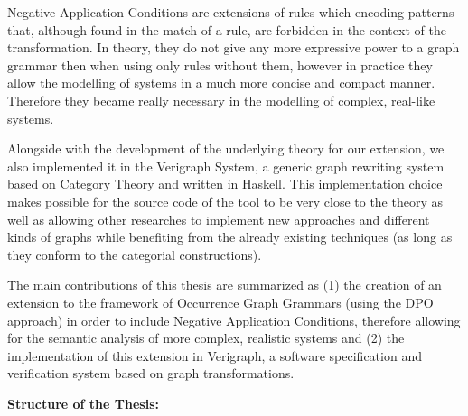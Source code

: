 Negative Application Conditions are extensions of rules which encoding patterns that, although found in the match of a rule, are forbidden in the context of the transformation. In theory, they do not give any more expressive power to a graph grammar then when using only rules without them, however in practice they allow the modelling of systems in a much more concise and compact manner. Therefore they became really necessary in the modelling of complex, real-like systems.

Alongside with the development of the underlying theory for our extension, we also implemented it in the Verigraph System, a generic graph rewriting system based on Category Theory and written in Haskell. This implementation choice makes possible for the source code of the tool to be very close to the theory as well as allowing other researches to implement new approaches and different kinds of graphs while benefiting from the already existing techniques (as long as they conform to the categorial constructions).



The main contributions of this thesis are summarized as (1) the creation of an extension  to the framework of Occurrence Graph Grammars (using the DPO approach) in order to include Negative Application Conditions, therefore allowing for the semantic analysis of more complex, realistic systems and (2) the implementation of this extension in Verigraph, a software specification and verification system based on graph transformations.

\hfill \break
\textbf{Structure of the Thesis:}

